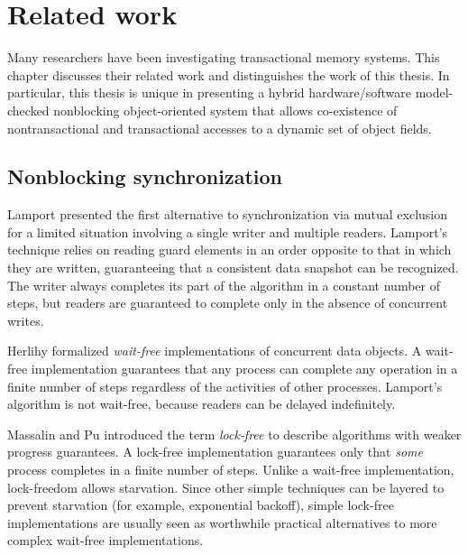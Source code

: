 \chapter{Related work}\label{cha:related}

Many researchers have been investigating transactional memory
systems.  This chapter discusses their related work and distinguishes
the work of this thesis.  In particular, this thesis
is unique in presenting a hybrid hardware/software
model-checked nonblocking
object-oriented system that allows co-existence of nontransactional and
transactional accesses to a dynamic set of object fields.

\section{Nonblocking synchronization}\label{sec:nb-sync}

Lamport \cite{Lamport77} presented the first alternative to
synchronization via mutual
exclusion for a limited situation involving a single
writer and multiple readers.  Lamport's technique relies on reading
guard elements in an order opposite to that in which they are written,
guaranteeing that a consistent data snapshot can be recognized.  The
writer always completes its part of the algorithm in a constant number
of steps, but readers are guaranteed to complete only in the absence of
concurrent writes.

Herlihy \cite{Herlihy88} formalized \emph{wait-free} implementations of
concurrent data objects.  A wait-free implementation
guarantees that any process can complete any operation in a finite
number of steps regardless of the activities of other processes.
Lamport's algorithm is not wait-free,
because readers can be delayed indefinitely.

Massalin and Pu \cite{MassalinPu91}
introduced the term \emph{lock-free} to describe 
algorithms with weaker progress guarantees.
A lock-free implementation guarantees only that \emph{some}
process completes in a finite number of steps.
Unlike a wait-free implementation,
lock-freedom allows starvation.  Since other simple techniques can be
layered to prevent starvation (for example, exponential backoff),
simple lock-free implementations are usually seen as worthwhile practical
alternatives to more complex wait-free implementations.

